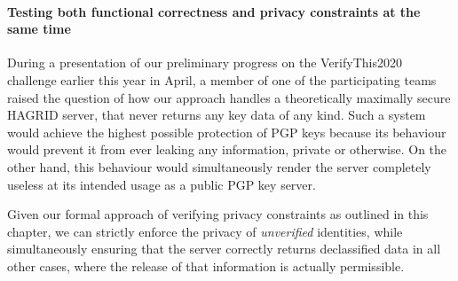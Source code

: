 \paragraph{Testing both functional correctness and privacy constraints at the same time}
During a presentation of our preliminary progress on the VerifyThis2020 challenge earlier this year in April, a member of one of the participating teams raised the question of how our approach handles a theoretically maximally secure HAGRID server, that never returns any key data of any kind. Such a system would achieve the highest possible protection of PGP keys because its behaviour would prevent it from ever leaking any information, private or otherwise. On the other hand, this behaviour would simultaneously render the server completely useless at its intended usage as a public PGP key server.

Given our formal approach of verifying privacy constraints as outlined in this chapter, we can strictly enforce the privacy of \emph{unverified} identities, while simultaneously ensuring that the server correctly returns declassified data in all other cases, where the release of that information is actually permissible. 


